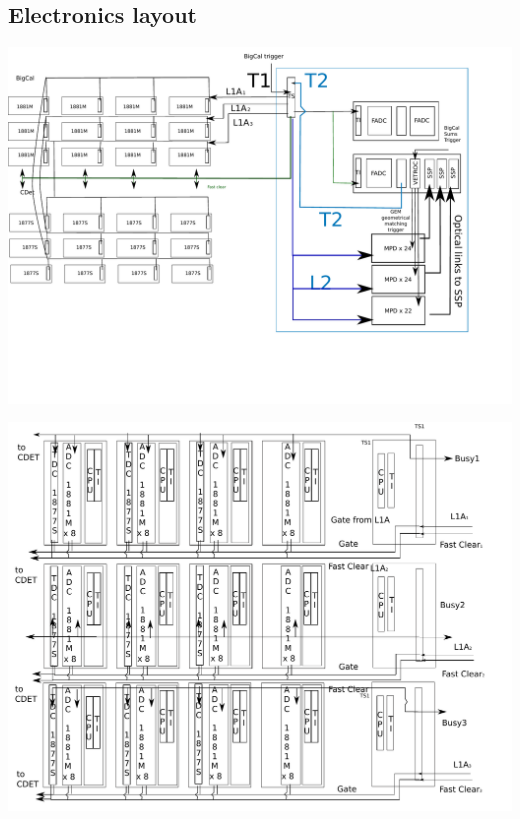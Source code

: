 \documentclass{article}
\begin{document}
\begin{appendices}
	

 \section {Electronics layout}
 \includegraphics[scale=0.4]{figs/SBSlayout.pdf}

 \includegraphics[scale=0.4]{figs/FastbusEcalDetailed.pdf}

%
%
%
%
%

% 


    \end{appendices}
\end{document}
